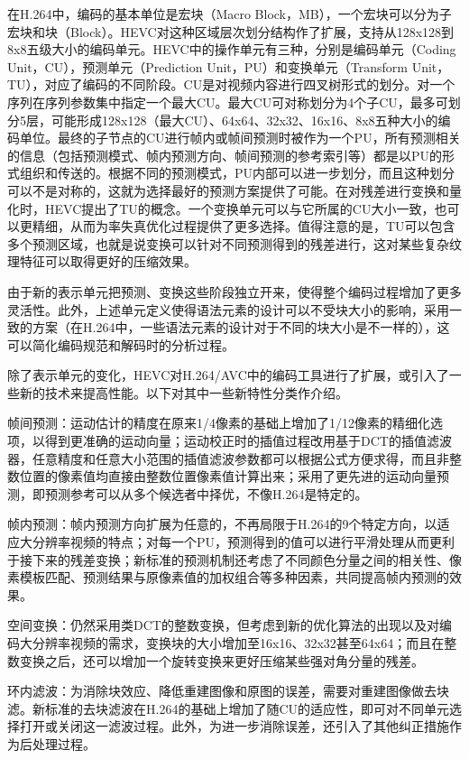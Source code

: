 在H.264中，编码的基本单位是宏块（Macro Block，MB），一个宏块可以分为子宏块和块（Block）。HEVC对这种区域层次划分结构作了扩展，支持从128x128到8x8五级大小的编码单元。HEVC中的操作单元有三种，分别是编码单元（Coding Unit，CU），预测单元（Prediction Unit，PU）和变换单元（Transform Unit，TU），对应了编码的不同阶段。CU是对视频内容进行四叉树形式的划分。对一个序列在序列参数集中指定一个最大CU。最大CU可对称划分为4个子CU，最多可划分5层，可能形成128x128（最大CU）、64x64、32x32、16x16、8x8五种大小的编码单位。最终的子节点的CU进行帧内或帧间预测时被作为一个PU，所有预测相关的信息（包括预测模式、帧内预测方向、帧间预测的参考索引等）都是以PU的形式组织和传送的。根据不同的预测模式，PU内部可以进一步划分，而且这种划分可以不是对称的，这就为选择最好的预测方案提供了可能。在对残差进行变换和量化时，HEVC提出了TU的概念。一个变换单元可以与它所属的CU大小一致，也可以更精细，从而为率失真优化过程提供了更多选择。值得注意的是，TU可以包含多个预测区域，也就是说变换可以针对不同预测得到的残差进行，这对某些复杂纹理特征可以取得更好的压缩效果。

由于新的表示单元把预测、变换这些阶段独立开来，使得整个编码过程增加了更多灵活性。此外，上述单元定义使得语法元素的设计可以不受块大小的影响，采用一致的方案（在H.264中，一些语法元素的设计对于不同的块大小是不一样的），这可以简化编码规范和解码时的分析过程。

除了表示单元的变化，HEVC对H.264/AVC中的编码工具进行了扩展，或引入了一些新的技术来提高性能。以下对其中一些新特性分类作介绍。

帧间预测：运动估计的精度在原来1/4像素的基础上增加了1/12像素的精细化选项，以得到更准确的运动向量；运动校正时的插值过程改用基于DCT的插值滤波器，任意精度和任意大小范围的插值滤波参数都可以根据公式方便求得，而且非整数位置的像素值均直接由整数位置像素值计算出来；采用了更先进的运动向量预测，即预测参考可以从多个候选者中择优，不像H.264是特定的。

帧内预测：帧内预测方向扩展为任意的，不再局限于H.264的9个特定方向，以适应大分辨率视频的特点；对每一个PU，预测得到的值可以进行平滑处理从而更利于接下来的残差变换；新标准的预测机制还考虑了不同颜色分量之间的相关性、像素模板匹配、预测结果与原像素值的加权组合等多种因素，共同提高帧内预测的效果。

空间变换：仍然采用类DCT的整数变换，但考虑到新的优化算法的出现以及对编码大分辨率视频的需求，变换块的大小增加至16x16、32x32甚至64x64；而且在整数变换之后，还可以增加一个旋转变换来更好压缩某些强对角分量的残差。

环内滤波：为消除块效应、降低重建图像和原图的误差，需要对重建图像做去块滤。新标准的去块滤波在H.264的基础上增加了随CU的适应性，即可对不同单元选择打开或关闭这一滤波过程。此外，为进一步消除误差，还引入了其他纠正措施作为后处理过程。


